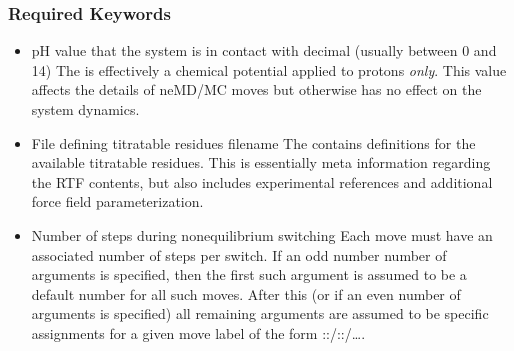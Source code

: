\subsubsection{Required Keywords}
\begin{itemize}
\item {}
{pH value that the system is in contact with}
{decimal (usually between 0 and 14)}
{
The  is effectively a chemical potential applied to protons
  \emph{only}.
This value affects the details of neMD/MC moves but otherwise has no effect
  on the system dynamics.
}

\item {}
{File defining titratable residues}
{filename}
{
The  contains definitions for the available titratable 
  residues.
This is essentially meta information regarding the RTF contents, but also
  includes experimental references and additional force field parameterization.
}

\item {}
{Number of steps during nonequilibrium switching}
{
}
{
Each move must have an associated number of steps per switch. 
If an odd number number of arguments is specified, then the first such argument
  is assumed to be a default number for all such moves.
After this (or if an even number of arguments is specified) all remaining
  arguments are assumed to be specific assignments for a given move label
  of the form ::/::/\ldots.
}
\end{itemize}

